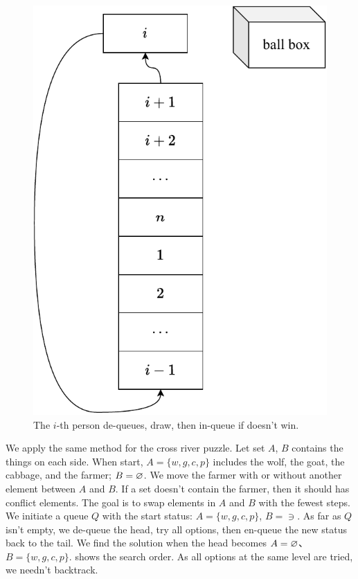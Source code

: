 \documentclass[b5paper]{article}
\begin{document}
\begin{figure}[htbp]
 \centering
 \includegraphics[scale=0.5]{img/luckydraw-queue}
 \caption{The $i$-th person de-queues, draw, then in-queue if doesn't win.}
 \label{fig:luck-draw}
\end{figure}

We apply the same method for the cross river puzzle. Let set $A$, $B$ contains the things on each side. When start, $A = \{w, g, c, p\}$ includes the wolf, the goat, the cabbage, and the farmer; $B=\varnothing$. We move the farmer with or without another element between $A$ and $B$. If a set doesn't contain the farmer, then it should has conflict elements. The goal is to swap elements in $A$ and $B$ with the fewest steps. We initiate a queue $Q$ with the start status: $A = \{w, g, c, p\}$, $B=\ni$. As far as $Q$ isn't empty, we de-queue the head, try all options, then en-queue the new status back to the tail. We find the solution when the head becomes $A=\varnothing$、$B=\{w, g, c, p\}$.  shows the search order. As all options at the same level are tried, we needn't backtrack.
\end{document}
